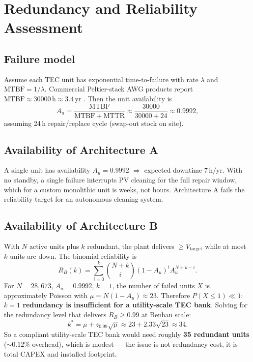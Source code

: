 \documentclass[11pt,a4paper]{article}
\newcommand{\SI}[2]{#1\,\ensuremath{\mathrm{#2}}}
\providecommand{\hour}{h}
\providecommand{\year}{yr}
\begin{document}
\section{Redundancy and Reliability Assessment}
\label{sec:redundancy}

\subsection{Failure model}
Assume each TEC unit has exponential time-to-failure with rate $\lambda$ and $\mathrm{MTBF}{=}1/\lambda$. Commercial Peltier-stack AWG products report $\mathrm{MTBF}{\approx}\SI{30000}{\hour}\approx 3.4\,\mathrm{yr}$ \citep{enescu2019peltierreview,peltier_handbook_2018}. Then the unit availability is
\begin{equation}
A_u = \frac{\mathrm{MTBF}}{\mathrm{MTBF}+\mathrm{MTTR}} \approx \frac{30000}{30000+24} \approx 0.9992,
\end{equation}
assuming 24\,h repair/replace cycle (swap-out stock on site).

\subsection{Availability of Architecture A}
A single unit has availability $A_u{=}0.9992$ $\Rightarrow$ expected downtime $\SI{7}{\hour/\year}$. With no standby, a single failure interrupts PV cleaning for the full repair window, which for a custom monolithic unit is weeks, not hours. Architecture A fails the reliability target for an autonomous cleaning system.

\subsection{Availability of Architecture B}
With $N$ active units plus $k$ redundant, the plant delivers $\ge V_{\mathrm{target}}$ while at most $k$ units are down. The binomial reliability is
\begin{equation}
R_{B}(k)
= \sum_{i=0}^{k}\binom{N+k}{i}(1-A_u)^i A_u^{N+k-i}.
\end{equation}
For $N{=}28{,}673$, $A_u{=}0.9992$, $k{=}1$, the number of failed units $X$ is approximately Poisson with $\mu{=}N(1-A_u){\approx}23$. Therefore $P(X{\le}1){\ll}1$: \textbf{$k{=}1$ redundancy is insufficient for a utility-scale TEC bank}. Solving for the redundancy level that delivers $R_{B}{\ge}0.99$ at Benban scale:
\begin{equation}
k^\ast = \mu + z_{0.99}\sqrt{\mu}
\approx 23 + 2.33\sqrt{23}
\approx 34.
\end{equation}
So a compliant utility-scale TEC bank would need roughly \textbf{35 redundant units} ($\sim$0.12\% overhead), which is modest --- the issue is not redundancy cost, it is total CAPEX and installed footprint.
\end{document}

